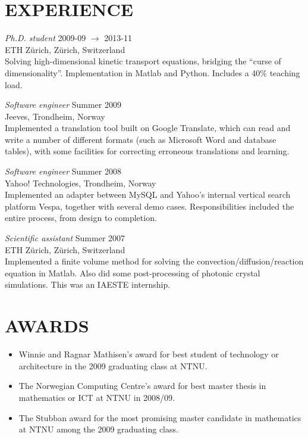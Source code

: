 \documentclass[line,margin]{res}
\newcommand{\zh}{Z\"{u}rich}
\begin{document}
\begin{resume}
\section{EXPERIENCE} 
    {\em Ph.D. student} \hfill 2009-09 $\to$ 2013-11 \\
    ETH \zh, \zh, Switzerland \\
    Solving high-dimensional kinetic transport equations, bridging the ``curse
    of dimensionality''.  Implementation in Matlab and Python. Includes a 40\%
    teaching load.

    {\em Software engineer} \hfill Summer 2009 \\
    Jeeves, Trondheim, Norway \\
    Implemented a translation tool built on Google Translate, which can read and
    write a number of different formats (such as Microsoft Word and database
    tables), with some facilities for correcting erroneous translations and
    learning.

    {\em Software engineer} \hfill Summer 2008 \\
    Yahoo! Technologies, Trondheim, Norway \\
    Implemented an adapter between MySQL and Yahoo's internal vertical search
    platform Vespa, together with several demo cases. Responsibilities included
    the entire process, from design to completion.

    {\em Scientific assistant} \hfill Summer 2007 \\
    ETH \zh, \zh, Switzerland \\
    Implemented a finite volume method for solving the
    convection/diffusion/reaction equation in Matlab. Also did some
    post-processing of photonic crystal simulations. This was an IAESTE
    internship.


\section{AWARDS}
    \begin{itemize}
        \item Winnie and Ragnar Mathisen's award for best student of technology
            or architecture in the 2009 graduating class at NTNU.
        \item The Norwegian Computing Centre's award for best master thesis in
            mathematics or ICT at NTNU in 2008/09.
        \item The Stubban award for the most promising master candidate in
            mathematics at NTNU among the 2009 graduating class.
    \end{itemize}



\end{resume}
\end{document}
